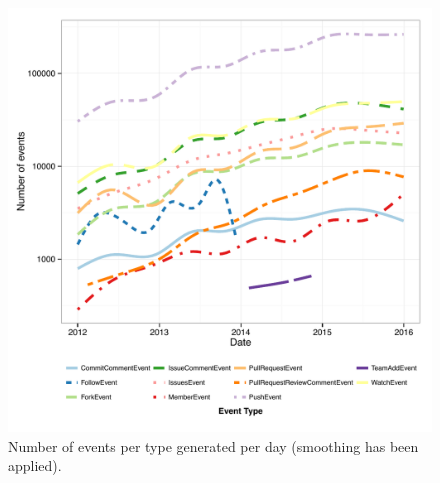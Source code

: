 \documentclass{sig-alternate}
\begin{document}
\begin{figure}
  \begin{center}
    \includegraphics[scale=0.5]{github-growth}
  \end{center}
  \caption{Number of events per type generated per day (smoothing has been
  applied).}
  \label{fig:growth}
\end{figure}
\end{document}
